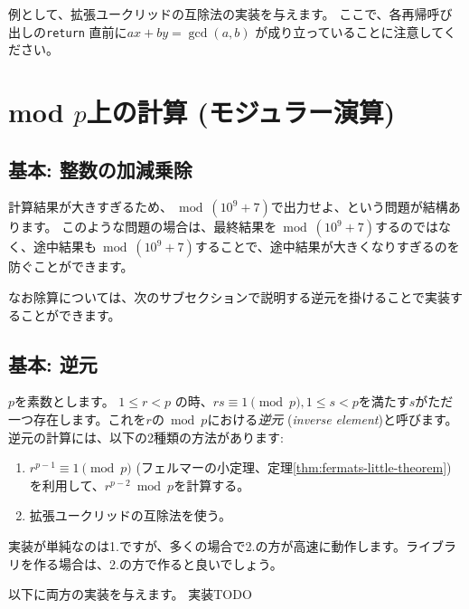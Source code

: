 \documentclass{jsarticle}
\begin{document}
  例として、拡張ユークリッドの互除法の実装を与えます。
  ここで、各再帰呼び出しの\verb+return+ 直前に$ax+by=\gcd(a,b)$ が成り立っていることに注意してください。
  
 \section{mod $p$上の計算 (モジュラー演算)}
 \label{sec:mod-p-arithmetic}
  \subsection{基本: 整数の加減乗除}
  計算結果が大きすぎるため、${} \bmod (10^9+7)$で出力せよ、という問題が結構あります。
  このような問題の場合は、最終結果を${} \bmod (10^9+7)$するのではなく、途中結果も${} \bmod (10^9+7)$することで、途中結果が大きくなりすぎるのを防ぐことができます。

  なお除算については、次のサブセクションで説明する逆元を掛けることで実装することができます。
  \subsection{基本: 逆元}
  \label{subsec:inverse-element}
  $p$を素数とします。
  $1 \le r < p$ の時、$rs \equiv 1 \pmod p, 1 \le s < p$を満たす$s$がただ一つ存在します。これを$r$の${} \bmod p$における\emph{逆元} (\emph{inverse element})と呼びます。
  逆元の計算には、以下の2種類の方法があります:
  \begin{enumerate}
   \item $r^{p-1} \equiv 1 \pmod p$ (フェルマーの小定理、定理\ref{thm:fermats-little-theorem})を利用して、$r^{p-2} \bmod p$を計算する。
   \item 拡張ユークリッドの互除法を使う。
  \end{enumerate}
  実装が単純なのは1.ですが、多くの場合で2.の方が高速に動作します。ライブラリを作る場合は、2.の方で作ると良いでしょう。

  以下に両方の実装を与えます。 実装TODO
\end{document}
